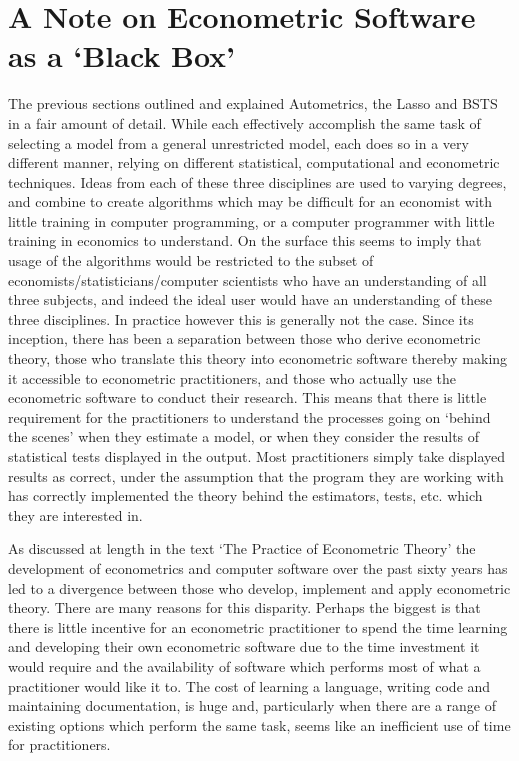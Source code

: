 
\section{A Note on Econometric Software as a `Black Box'}
The previous sections outlined and explained Autometrics, the Lasso and BSTS in a fair amount of detail. While each effectively accomplish the same task of selecting a model from a general unrestricted model, each does so in a very different manner, relying on different statistical, computational and econometric techniques. Ideas from each of these three disciplines are used to varying degrees, and combine to create algorithms which may be difficult for an economist with little training in computer programming, or a computer programmer with little training in economics to understand. On the surface this seems to imply that usage of the algorithms would be restricted to the subset of economists/statisticians/computer scientists who have an understanding of all three subjects, and indeed the ideal user would have an understanding of these three disciplines. In practice however this is generally not the case. Since its inception, there has been a separation between those who derive econometric theory, those who translate this theory into econometric software thereby making it accessible to econometric practitioners, and those who actually use the econometric software to conduct their research. This means that there is little requirement for the practitioners to understand the processes going on `behind the scenes' when they estimate a model, or when they consider the results of statistical tests displayed in the output. Most practitioners simply take displayed results as correct, under the assumption that the program they are working with has correctly implemented the theory behind the estimators, tests, etc. which they are interested in.

As discussed at length in the text `The Practice of Econometric Theory' \cite{renfro2009} the development of econometrics and computer software over the past sixty years has led to a divergence between those who develop, implement and apply econometric theory. There are many reasons for this disparity. Perhaps the biggest is that there is little incentive for an econometric practitioner to spend the time learning and developing their own econometric software due to the time investment it would require and the availability of software which performs most of what a practitioner would like it to. The cost of learning a language, writing code and maintaining documentation, is huge and, particularly when there are a  range of existing options which perform the same task, seems like an inefficient use of time for practitioners. 

